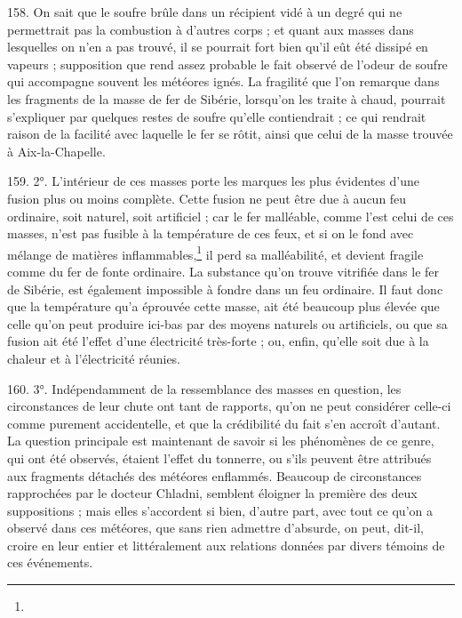 \documentclass[a4paper, 11pt, oneside, polutonikogreek, french]{article}
\begin{document}
158. On sait que le soufre brûle dans un récipient vidé à un degré qui ne permettrait pas la combustion à d'autres corps ; et quant aux masses dans lesquelles on n'en a pas trouvé, il se pourrait fort bien qu'il eût été dissipé en vapeurs ; supposition que rend assez probable le fait observé de l'odeur de soufre qui accompagne souvent les météores ignés. La fragilité que l'on remarque dans les fragments de la masse de fer de Sibérie, lorsqu’on les traite à chaud, pourrait s'expliquer par quelques restes de soufre qu'elle contiendrait ; ce qui rendrait raison de la facilité avec laquelle le fer se rôtit, ainsi que celui de la masse trouvée à Aix-la-Chapelle.

159. 2°. L'intérieur de ces masses porte les marques les plus évidentes d'une fusion plus ou moins complète. Cette fusion ne peut être due à aucun feu ordinaire, soit naturel, soit artificiel ; car le fer malléable, comme l'est celui de ces masses, n'est pas fusible à la température de ces feux, et si on le fond avec mélange de matières inflammables,\footnote{} il perd sa malléabilité, et devient fragile comme du fer de fonte ordinaire. La substance qu'on trouve vitrifiée dans le fer de Sibérie, est également impossible à fondre dans un feu ordinaire. Il faut donc que la température qu'a éprouvée cette masse, ait été beaucoup plus élevée que celle qu'on peut produire ici-bas par des moyens naturels ou artificiels, ou que sa fusion ait été l'effet d'une électricité très-forte ; ou, enfin, qu'elle soit due à la chaleur et à l'électricité réunies.

160. 3°. Indépendamment de la ressemblance des masses en question, les circonstances de leur chute ont tant de rapports, qu'on ne peut considérer celle-ci comme purement accidentelle, et que la crédibilité du fait s'en accroît d'autant. La question principale est maintenant de savoir si les phénomènes de ce genre, qui ont été observés, étaient l'effet du tonnerre, ou s'ils peuvent être attribués aux fragments détachés des météores enflammés. Beaucoup de circonstances rapprochées par le docteur Chladni, semblent éloigner la première des deux suppositions ; mais elles s'accordent si bien, d'autre part, avec tout ce qu'on a observé dans ces météores, que sans rien admettre d'absurde, on peut, dit-il, croire en leur entier et littéralement aux relations données par divers témoins de ces événements.
\end{document}
